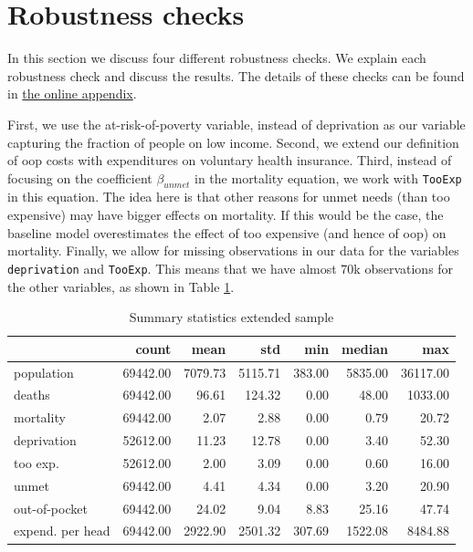 \documentclass[a4paper,12pt]{article}
\begin{document}
\section{Robustness checks}
\label{sec:org90fea65}

In this section we discuss four different robustness checks. We explain each robustness check and discuss the results. The details of these checks can be found in \href{https://janboone.github.io/out\_of\_pocket\_payments\_and\_health/index.html\#org5ed5f60}{the online appendix}.

First, we use the at-risk-of-poverty variable, instead of deprivation as our variable capturing the fraction of people on low income. Second, we extend our definition of oop costs with expenditures on voluntary health insurance. Third, instead of focusing on the coefficient \(\beta_{unmet}\) in the mortality equation, we work with \texttt{TooExp} in this equation. The idea here is that other reasons for unmet needs (than too expensive) may have bigger effects on mortality. If this would be the case, the baseline model overestimates the effect of too expensive (and hence of oop) on mortality. Finally, we allow for missing observations in our data for the variables \texttt{deprivation} and \texttt{TooExp}. This means that we have almost 70k observations for the other variables, as shown in Table \ref{tab:summary_extended_data}.

\begin{table}[htbp]
\caption{\label{tab:summary_extended_data}Summary statistics extended sample}
\centering
\begin{tabular}{lrrrrrr}
 & count & mean & std & min & median & max\\
\hline
population & 69442.00 & 7079.73 & 5115.71 & 383.00 & 5835.00 & 36117.00\\
deaths & 69442.00 & 96.61 & 124.32 & 0.00 & 48.00 & 1033.00\\
mortality & 69442.00 & 2.07 & 2.88 & 0.00 & 0.79 & 20.72\\
deprivation & 52612.00 & 11.23 & 12.78 & 0.00 & 3.40 & 52.30\\
too exp. & 52612.00 & 2.00 & 3.09 & 0.00 & 0.60 & 16.00\\
unmet & 69442.00 & 4.41 & 4.34 & 0.00 & 3.20 & 20.90\\
out-of-pocket & 69442.00 & 24.02 & 9.04 & 8.83 & 25.16 & 47.74\\
expend. per head & 69442.00 & 2922.90 & 2501.32 & 307.69 & 1522.08 & 8484.88\\
\end{tabular}
\end{table}
\end{document}
